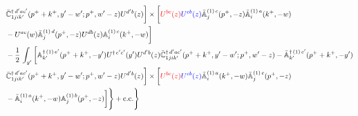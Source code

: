\documentclass[10pt]{article}
\def\mf#1{\mathbb{#1}}
\numberwithin{equation}{section}
\begin{document}
\begin{align}
& \Bar{\mf{C}}^{\dagger\, d^{\prime}ac^{\prime}}_{1jik^{\prime}}(p^{+}+k^{+},y^{\prime}-w^{\prime}; p^{+},w^{\prime}-z)U^{d^{\prime}b}(z)\bigg] \times  \bigg[\textcolor{red}{U^{bc}(z)}\textcolor{blue}{U^{cb}(z)}\Bar{\mf{A}}^{(1)\, c}_{j}(p^{+},-z)\Bar{\mf{A}}^{(1)\, a}_{i}(k^{+},-w)\notag \\ & -U^{ac}(w) \Bar{\mf{A}}^{(1)\, d}_{j}(p^{+},-z)U^{db}(z) \mf{A}^{(1)\, c}_{i}(k^{+},- w)\bigg]\notag \\ & - \frac{1}{2}\,\int_{y^{\prime}}\bigg[\mf{A}^{\dagger\, (1)\,e^{\prime}}_{k^{\prime}}(p^{+}+k^{+},-y^{\prime})U^{\dagger\, e^{\prime}c^{\prime}}(y^{\prime})U^{d^{\prime}b}(z) \Bar{\mf{C}}^{\dagger\, d^{\prime}ac^{\prime}}_{1jik^{\prime}}(p^{+}+k^{+},y^{\prime}-w^{\prime}; p^{+},w^{\prime}-z)  -\Bar{\mf{A}}^{\dagger\, (1)\,c^{\prime}}_{k^{\prime}}(p^{+}+k^{+},-y^{\prime})\notag \\ & \Bar{\mf{C}}^{\dagger\, d^{\prime}ac^{\prime}}_{1jik^{\prime}}(p^{+}+k^{+},y^{\prime}-w^{\prime}; p^{+},w^{\prime}-z)U^{d^{\prime}b}(z)\bigg] \times \bigg[\textcolor{red}{U^{bc}(z)}\textcolor{blue}{U^{cb}(z)}\Bar{\mf{A}}^{(1)\, a}_{i}(k^{+},- w)\Bar{\mf{A}}^{(1)\, c}_{j}(p^{+},-z)\notag \\ & -\Bar{\mf{A}}^{(1)\, a}_{i}(k^{+},- w) \mf{A}^{(1)\, b}_{j}(p^{+},- z)\bigg]\Bigg\} +  {\rm c.c.} \Bigg\}
\end{align}
\newpage
\appendix
\end{document}
